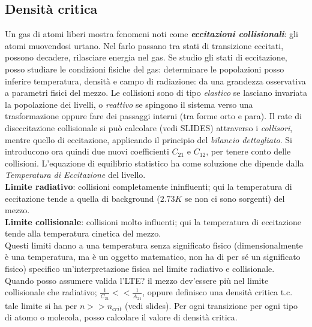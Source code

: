 \subsection*{Densità critica}
Un gas di atomi liberi mostra fenomeni noti come \textbf{\textit{eccitazioni collisionali}}: gli atomi muovendosi urtano.
Nel farlo passano tra stati di transizione eccitati, possono decadere, rilasciare energia nel gas. 
Se studio gli stati di eccitazione, posso studiare le condizioni fisiche del gas: determinare le popolazioni posso inferire temperatura, densità e campo di radiazione: da una grandezza osservativa a parametri fisici del mezzo.
Le collisioni sono di tipo \textit{elastico} se lasciano invariata la popolazione dei livelli, o \textit{reattivo} se spingono il sistema verso una trasformazione oppure fare dei passaggi interni (tra forme orto e para).
Il rate di diseccitazione collisionale si può calcolare (vedi SLIDES) attraverso i \textit{collisori}, mentre quello di eccitazione, applicando il principio del \textit{bilancio dettagliato}.
Si introducono ora quindi due nuovi coefficienti $C_{21}$ e $C_{12}$, per tenere conto delle collisioni.
L'equazione di equilibrio statistico ha come soluzione che dipende dalla \textit{Temperatura di Eccitazione} del livello.\\
\textbf{Limite radiativo}: collisioni completamente ininfluenti; qui la temperatura di eccitazione tende a quella di background ($2.73K$ se non ci sono sorgenti) del mezzo.\\
\textbf{Limite collisionale}: collisioni molto influenti; qui la temperatura di eccitazione tende alla temperatura cinetica del mezzo.\\
Questi limiti danno a una temperatura senza significato fisico (dimensionalmente è una temperatura, ma è un oggetto matematico, non ha di per sé un significato fisico) specifico un'interpretazione fisica nel limite radiativo e collisionale.\\
Quando posso assumere valida l'LTE? il mezzo dev'essere più nel limite collisionale che radiativo; $\frac{1}{C_{21}} << \frac{1}{A_{21}}$, oppure definisco una densità critica t.c. tale limite si ha per $n >> n_{crit}$ (\textbf{}{vedi slides}).
Per ogni transizione per ogni tipo di atomo o molecola, posso calcolare il valore di densità critica. 

